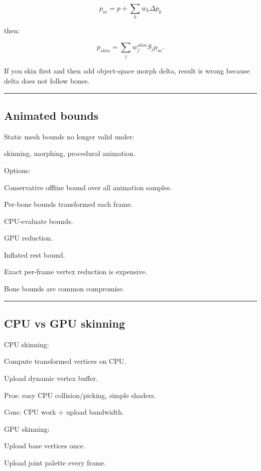 \[
\boxed{
p_m=
p+
\sum_kw_k\Delta p_k
}
\]

then:

\[
\boxed{
p_{skin}
=
\sum_j
w_j^{skin}
S_j
p_m.
}
\]

If you skin first and then add object-space morph delta, result is wrong because delta does not follow bones.

\begin{center}\rule{0.5\linewidth}{0.5pt}\end{center}

\subsection{Animated bounds}\label{04-visual-computing-ii-ch041-animated-bounds}

Static mesh bounds no longer valid under:

skinning, morphing, procedural animation.

Options:

Conservative offline bound over all animation samples.

Per-bone bounds transformed each frame.

CPU-evaluate bounds.

GPU reduction.

Inflated rest bound.

Exact per-frame vertex reduction is expensive.

Bone bounds are common compromise.

\begin{center}\rule{0.5\linewidth}{0.5pt}\end{center}

\subsection{CPU vs GPU skinning}\label{04-visual-computing-ii-ch041-cpu-vs-gpu-skinning}

CPU skinning:

Compute transformed vertices on CPU.

Upload dynamic vertex buffer.

Pros: easy CPU collision/picking, simple shaders.

Cons: CPU work + upload bandwidth.

GPU skinning:

Upload base vertices once.

Upload joint palette every frame.

